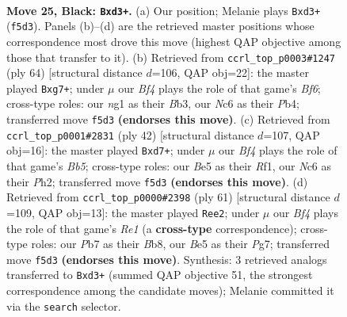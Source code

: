 \documentclass[11pt]{article}
\begin{document}
\clearpage

\begin{figure}[p]\centering
\begin{subfigure}{0.46\textwidth}\centering
\resizebox{\linewidth}{!}{%
\newchessgame
\chessboard[
  setfen={r3k3/pp6/2n3p1/4bbP1/5Q2/3B4/3B4/1R3KN1 b q - 0 25},
  showmover=false,
  pgfstyle=straightmove, color=movearrow, markmove={f5-d3}
]}
\caption{}
\end{subfigure}\hfill
\begin{subfigure}{0.46\textwidth}\centering
\resizebox{\linewidth}{!}{%
\newchessgame
\chessboard[
  setfen={4r2k/1qpN2b1/1n3Bpp/6N1/1P2P3/1B5P/5PP1/2R3K1 w - - 2 33},
  showmover=false,
  pgfstyle=straightmove, color=movearrow, markmove={f6-g7}
]}
\caption{}
\end{subfigure}
\\[4pt]
\begin{subfigure}{0.46\textwidth}\centering
\resizebox{\linewidth}{!}{%
\newchessgame
\chessboard[
  setfen={4kr2/3qp2p/6p1/1Bp5/2P2Pn1/4B3/2P3KP/5R2 w - - 1 22},
  showmover=false,
  pgfstyle=straightmove, color=movearrow, markmove={b5-d7}
]}
\caption{}
\end{subfigure}\hfill
\begin{subfigure}{0.46\textwidth}\centering
\resizebox{\linewidth}{!}{%
\newchessgame
\chessboard[
  setfen={1b2r1k1/5pp1/1PQ2Bn1/7p/5P2/8/r6P/5R1K b - - 0 31},
  showmover=false,
  pgfstyle=straightmove, color=movearrow, markmove={e8-e2}
]}
\caption{}
\end{subfigure}
\caption{\textbf{Move 25, Black: \texttt{Bxd3+}.} (a) Our position; Melanie plays \texttt{Bxd3+} (\texttt{f5d3}). Panels (b)--(d) are the retrieved master positions whose correspondence most drove this move (highest QAP objective among those that transfer to it). (b) Retrieved from \texttt{ccrl\_top\_p0003\#1247} (ply 64) [structural distance $d$=106, QAP obj=22]: the master played \texttt{Bxg7+}; under $\mu$ our \emph{Bf4} plays the role of that game's \emph{Bf6}; cross-type roles: our \emph{n}g1 as their \emph{B}b3, our \emph{N}c6 as their \emph{P}b4; transferred move \texttt{f5d3} \textbf{(endorses this move)}. (c) Retrieved from \texttt{ccrl\_top\_p0001\#2831} (ply 42) [structural distance $d$=107, QAP obj=16]: the master played \texttt{Bxd7+}; under $\mu$ our \emph{Bf4} plays the role of that game's \emph{Bb5}; cross-type roles: our \emph{B}e5 as their \emph{R}f1, our \emph{N}c6 as their \emph{P}h2; transferred move \texttt{f5d3} \textbf{(endorses this move)}. (d) Retrieved from \texttt{ccrl\_top\_p0000\#2398} (ply 61) [structural distance $d$=109, QAP obj=13]: the master played \texttt{Ree2}; under $\mu$ our \emph{Bf4} plays the role of that game's \emph{Re1} (a \textbf{cross-type} correspondence); cross-type roles: our \emph{P}b7 as their \emph{B}b8, our \emph{B}e5 as their \emph{P}g7; transferred move \texttt{f5d3} \textbf{(endorses this move)}. Synthesis: 3 retrieved analogs transferred to \texttt{Bxd3+} (summed QAP objective 51, the strongest correspondence among the candidate moves); Melanie committed it via the \texttt{search} selector.}
\label{fig:thought-m49}
\end{figure}
\end{document}

